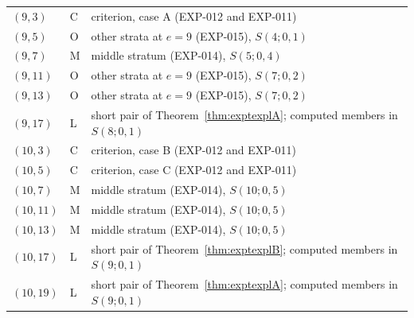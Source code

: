 \begin{tabular}{@{}ll>{\raggedright\arraybackslash}p{9.8cm}@{}}
$(9,3)$ & C & criterion, case A (EXP-012 and EXP-011)\\
$(9,5)$ & O & other strata at $e=9$ (EXP-015), $S(4;0,1)$\\
$(9,7)$ & M & middle stratum (EXP-014), $S(5;0,4)$\\
$(9,11)$ & O & other strata at $e=9$ (EXP-015), $S(7;0,2)$\\
$(9,13)$ & O & other strata at $e=9$ (EXP-015), $S(7;0,2)$\\
$(9,17)$ & L & short pair of Theorem~\ref{thm:exptexplA}; computed members in $S(8;0,1)$\\
$(10,3)$ & C & criterion, case B (EXP-012 and EXP-011)\\
$(10,5)$ & C & criterion, case C (EXP-012 and EXP-011)\\
$(10,7)$ & M & middle stratum (EXP-014), $S(10;0,5)$\\
$(10,11)$ & M & middle stratum (EXP-014), $S(10;0,5)$\\
$(10,13)$ & M & middle stratum (EXP-014), $S(10;0,5)$\\
$(10,17)$ & L & short pair of Theorem~\ref{thm:exptexplB}; computed members in $S(9;0,1)$\\
$(10,19)$ & L & short pair of Theorem~\ref{thm:exptexplA}; computed members in $S(9;0,1)$\\
\bottomrule
\end{tabular}

